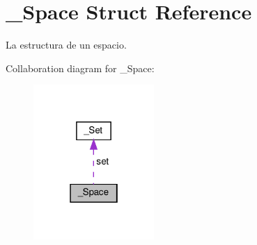 \hypertarget{struct__Space}{}\section{\+\_\+\+Space Struct Reference}
\label{struct__Space}


La estructura de un espacio.  




Collaboration diagram for \+\_\+\+Space\+:\nopagebreak
\begin{figure}[H]
\begin{center}
\leavevmode
\includegraphics[width=130pt]{struct__Space__coll__graph}
\end{center}
\end{figure}
